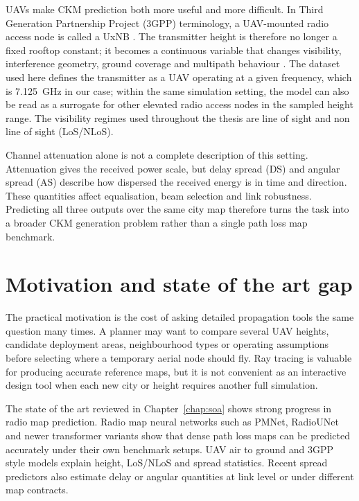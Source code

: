 UAVs make CKM prediction both more useful and more difficult. In Third
Generation Partnership Project (3GPP) terminology, a UAV-mounted radio access
node is called a UxNB \cite{threegpp22125}. The
transmitter height is therefore no longer a fixed rooftop constant; it becomes a
continuous variable that changes visibility, interference geometry, ground
coverage and multipath behaviour \cite{saboor2025height}. The dataset used here
defines the transmitter as a UAV operating at a given frequency, which is
\SI{7.125}{GHz} in our case; within the same simulation setting, the
model can also be read as a surrogate for other elevated radio access nodes in
the sampled height range. The visibility regimes used throughout the thesis are
line of sight and non line of sight (LoS/NLoS).

Channel attenuation alone is not a complete description of this setting.
Attenuation gives the received power scale, but delay spread (DS) and angular
spread (AS) describe how dispersed the received energy is in time and direction.
These quantities affect equalisation, beam selection and link robustness.
Predicting all three outputs over the same city map therefore
turns the task into a broader CKM generation problem rather than a single path
loss map benchmark.

\section{Motivation and state of the art gap}
\label{sec:intro_sota_gap}

The practical motivation is the cost of asking detailed propagation tools the
same question many times. A planner may want to compare several UAV heights,
candidate deployment areas, neighbourhood types or operating assumptions before
selecting where a temporary aerial node should fly. Ray tracing is valuable for
producing accurate reference maps, but it is not convenient as an interactive
design tool when each new city or height requires another full simulation.

The state of the art reviewed in Chapter~\ref{chap:soa} shows strong progress
in radio map prediction. Radio map neural networks such as PMNet, RadioUNet and
newer transformer variants show that dense path loss maps can be predicted
accurately under their own benchmark setups. UAV air to ground and 3GPP style
models explain height, LoS/NLoS and spread statistics. Recent spread predictors
also estimate delay or angular quantities at link level or under different map
contracts.

